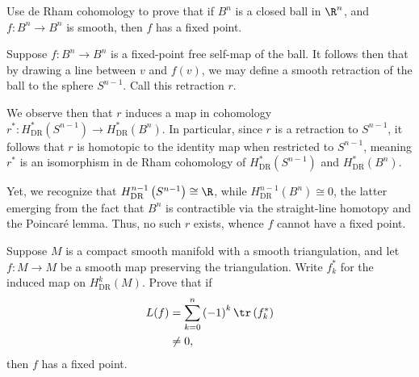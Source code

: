 \documentclass[10pt]{mypackage}
\begin{document}
\RaggedRight
\begin{problem}[Problem 1]
  Use de Rham cohomology to prove that if $B^{n}$ is a closed ball in $\R^{n}$, and $f\colon B^n\rightarrow B^n$ is smooth, then $f$ has a fixed point.
\end{problem}
\begin{solution}
  Suppose $f\colon B^n\rightarrow B^n$ is a fixed-point free self-map of the ball. It follows then that by drawing a line between $v$ and $f(v)$, we may define a smooth retraction of the ball to the sphere $S^{n-1}$. Call this retraction $r$.\newline

  We observe then that $r$ induces a map in cohomology $r^{\ast}\colon H^{\ast}_{\operatorname{DR}}\left( S^{n-1} \right)\rightarrow H^{\ast}_{\operatorname{DR}}\left( B^{n} \right)$. In particular, since $r$ is a retraction to $S^{n-1}$, it follows that $r$ is homotopic to the identity map when restricted to $S^{n-1}$, meaning $r^{\ast}$ is an isomorphism in de Rham cohomology of $H^{\ast}_{\operatorname{DR}}\left( S^{n-1} \right)$ and $H^{\ast}_{\operatorname{DR}}\left( B^n \right)$.\newline

  Yet, we recognize that $H^{n-1}_{\operatorname{DR}}\left( S^{n-1} \right)\cong \R$, while $H^{n-1}_{\operatorname{DR}}\left( B^{n} \right)\cong 0$, the latter emerging from the fact that $B^n$ is contractible via the straight-line homotopy and the Poincaré lemma. Thus, no such $r$ exists, whence $f$ cannot have a fixed point.
\end{solution}
\begin{problem}[Problem 2]
  Suppose $M$ is a compact smooth manifold with a smooth triangulation, and let $f\colon M\rightarrow M$ be a smooth map preserving the triangulation. Write $f_k^{\ast}$ for the induced map on $H^k_{\operatorname{DR}}\left( M \right)$. Prove that if
  \begin{align*}
    L(f) &= \sum_{k=0}^{n} \left( -1 \right)^{k}\tr\left( f_k^{\ast} \right)\\
         &\neq 0,
  \end{align*}
  then $f$ has a fixed point.
\end{problem}
\end{document}
